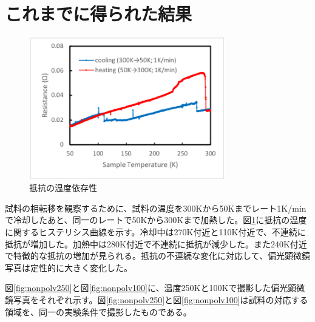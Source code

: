 \documentclass[11pt,a4paper]{jsarticle}
\begin{document}
\section{これまでに得られた結果}
\begin{figure}
  \begin{center}
  \vspace{-3zh}
   \hspace{-5mm}
   \includegraphics[width=85mm]{resistance50-300.eps}
  \end{center}
  \caption{抵抗の温度依存性}
  \label{fig:resistance50-300}
\end{figure}
試料の相転移を観察するために、試料の温度を300Kから50Kまでレート1K/minで冷却したあと、同一のレートで50Kから300Kまで加熱した。図\ref{fig:resistance50-300}に抵抗の温度に関するヒステリシス曲線を示す。冷却中は270K付近と110K付近で、不連続に抵抗が増加した。加熱中は280K付近で不連続に抵抗が減少した。また240K付近で特徴的な抵抗の増加が見られる。抵抗の不連続な変化に対応して、偏光顕微鏡写真は定性的に大きく変化した。


図\ref{fig:nonpolv250}と図\ref{fig:nonpolv100}に、温度250Kと100Kで撮影した偏光顕微鏡写真をそれぞれ示す。図\ref{fig:nonpolv250}と図\ref{fig:nonpolv100}は試料の対応する領域を、同一の実験条件で撮影したものである。
\end{document}
